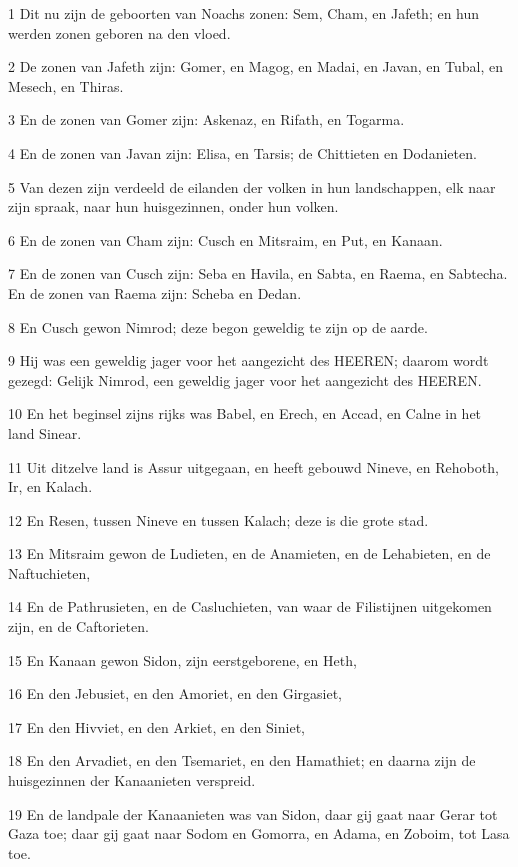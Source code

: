 \par 1 Dit nu zijn de geboorten van Noachs zonen: Sem, Cham, en Jafeth; en hun werden zonen geboren na den vloed.
\par 2 De zonen van Jafeth zijn: Gomer, en Magog, en Madai, en Javan, en Tubal, en Mesech, en Thiras.
\par 3 En de zonen van Gomer zijn: Askenaz, en Rifath, en Togarma.
\par 4 En de zonen van Javan zijn: Elisa, en Tarsis; de Chittieten en Dodanieten.
\par 5 Van dezen zijn verdeeld de eilanden der volken in hun landschappen, elk naar zijn spraak, naar hun huisgezinnen, onder hun volken.
\par 6 En de zonen van Cham zijn: Cusch en Mitsraim, en Put, en Kanaan.
\par 7 En de zonen van Cusch zijn: Seba en Havila, en Sabta, en Raema, en Sabtecha. En de zonen van Raema zijn: Scheba en Dedan.
\par 8 En Cusch gewon Nimrod; deze begon geweldig te zijn op de aarde.
\par 9 Hij was een geweldig jager voor het aangezicht des HEEREN; daarom wordt gezegd: Gelijk Nimrod, een geweldig jager voor het aangezicht des HEEREN.
\par 10 En het beginsel zijns rijks was Babel, en Erech, en Accad, en Calne in het land Sinear.
\par 11 Uit ditzelve land is Assur uitgegaan, en heeft gebouwd Nineve, en Rehoboth, Ir, en Kalach.
\par 12 En Resen, tussen Nineve en tussen Kalach; deze is die grote stad.
\par 13 En Mitsraim gewon de Ludieten, en de Anamieten, en de Lehabieten, en de Naftuchieten,
\par 14 En de Pathrusieten, en de Casluchieten, van waar de Filistijnen uitgekomen zijn, en de Caftorieten.
\par 15 En Kanaan gewon Sidon, zijn eerstgeborene, en Heth,
\par 16 En den Jebusiet, en den Amoriet, en den Girgasiet,
\par 17 En den Hivviet, en den Arkiet, en den Siniet,
\par 18 En den Arvadiet, en den Tsemariet, en den Hamathiet; en daarna zijn de huisgezinnen der Kanaanieten verspreid.
\par 19 En de landpale der Kanaanieten was van Sidon, daar gij gaat naar Gerar tot Gaza toe; daar gij gaat naar Sodom en Gomorra, en Adama, en Zoboim, tot Lasa toe.
